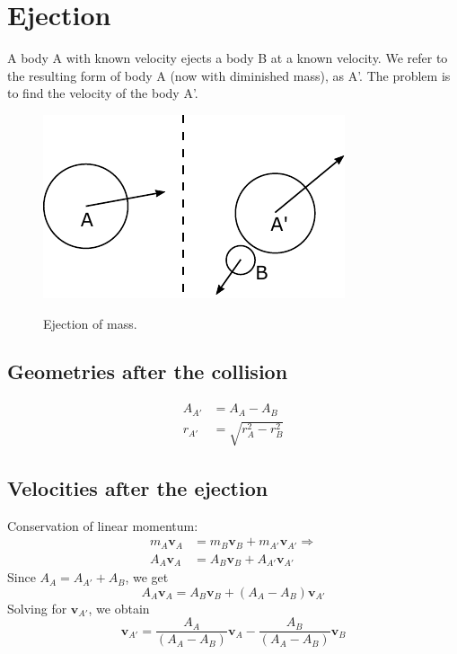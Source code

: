 \documentclass{article}
\newcommand{\vbs}[0]{\boldsymbol{v}}
\begin{document}
\section{Ejection}
A body A with known velocity ejects a body B at a known velocity. We refer to the resulting form of body A (now with diminished mass), as A'. The problem is to find the velocity of the body A'.

\begin{figure}[h]
	\centering
	{\includegraphics{figures/ejection.pdf}}
	\caption{Ejection of mass.}\label{fig:ejection}
\end{figure}

\subsection{Geometries after the collision}
\begin{equation}
\begin{split}
A_{A'} &= A_A - A_B\\
r_{A'} &= \sqrt{r_A^2 - r_B^2}
\end{split}
\end{equation}

\subsection{Velocities after the ejection}

Conservation of linear momentum:
\begin{equation*}
\begin{split}
m_A\vbs_A &= m_B\vbs_B + m_{A'}\vbs_{A'}
\Rightarrow
\\A_A\vbs_A &= A_B\vbs_B + A_{A'}\vbs_{A'}
\end{split}
\end{equation*}
Since $A_A = A_{A'} + A_B$, we get
\begin{equation*}
A_A\vbs_A = A_B\vbs_B + (A_A - A_B)\vbs_{A'}
\end{equation*}
Solving for $\vbs_{A'}$, we obtain
\begin{equation}
\vbs_{A'} = \frac{A_A}{(A_A - A_B)}\vbs_A - \frac{A_B}{(A_A - A_B)}\vbs_B
\end{equation}
\end{document}
